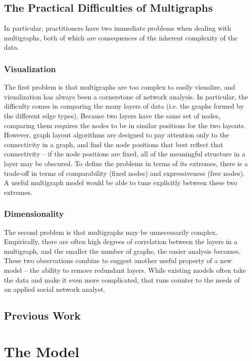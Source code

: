 \documentclass{article}
\begin{document}
\subsection{The Practical Difficulties of Multigraphs}
In particular, practitioners have two immediate problems when dealing with multigraphs, both of which are consequences of the inherent complexity of the data. 
\subsubsection{Visualization}
The first problem is that multigraphs are too complex to easily visualize, and visualization has always been a cornerstone of network analysis. In particular, the difficulty comes in comparing the many layers of data (i.e. the graphs formed by the different edge types). Because two layers have the same set of nodes, comparing them requires the nodes to be in similar positions for the two layouts. However, graph layout algorithms are designed to pay attention only to the connectivity in a graph, and find the node positions that best reflect that connectivity -- if the node positions are fixed, all of the meaningful structure in a layer may be obscured. To define the problems in terms of its extremes, there is a trade-off in terms of comparability (fixed nodes) and expressiveness (free nodes). A useful multigraph model would be able to tune explicitly between these two extremes.

\subsubsection{Dimensionality}
The second problem is that multigraphs may be unnecessarily complex. Empirically, there are often high degrees of correlation between the layers in a multigraph, and the smaller the number of graphs, the easier analysis becomes. These two observations combine to suggest another useful property of a new model -- the ability to remove redundant layers. While existing models often take the data and make it even more complicated, that runs counter to the needs of an applied social network analyst.

\subsection{Previous Work}
\cite{Amer2017, Friedman2008, Friedman2010, Gollini2017, Qin, Salter-townshend2013, Vincent, Wu2008}

\section{The Model}
\end{document}

